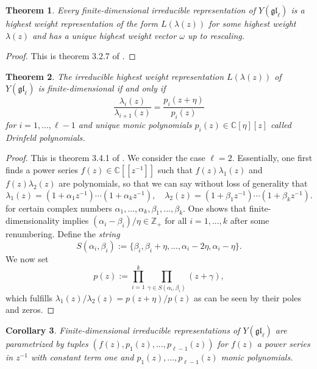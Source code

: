 \documentclass[11pt]{report}
\newtheorem{theorem}{Theorem}[section]
\newtheorem{corollary}[theorem]{Corollary}
\theoremstyle{definition}
\theoremstyle{remark}
\theoremstyle{remark}
\newcommand{\Z}{\mathbb{Z}}
\newcommand{\C}{\mathbb{C}}
\begin{document}
\begin{theorem}
Every finite-dimensional irreducible representation of $Y(\mathfrak{gl}_\ell)$ is a highest weight representation of the form $L(\lambda(z))$ for some highest weight $\lambda(z)$ and has a unique highest weight vector $\omega$ up to rescaling.
\end{theorem}

\begin{proof}
This is theorem 3.2.7 of \cite{book:molev}.
\end{proof}

\begin{theorem}
The irreducible highest weight representation $L(\lambda(z))$ of $Y(\mathfrak{gl}_\ell)$ is finite-dimensional if and only if
\begin{equation*}
\frac{\lambda_i(z)}{\lambda_{i+1}(z)} = \frac{p_i(z+\eta)}{p_i(z)}
\end{equation*}
for $i=1,...,\ell-1$ and unique monic polynomials $p_i(z) \in \C[\eta][z]$ called \emph{Drinfeld polynomials}.
\end{theorem}

\begin{proof}
This is theorem 3.4.1 of \cite{book:molev}. We consider the case $\ell = 2$. Essentially, one first finds a power series $f(z) \in \C[[z^{-1}]]$ such that $f(z) \lambda_1(z)$ and $f(z) \lambda_2(z)$ are polynomials, so that we can say without loss of generality that
\begin{equation*}
\lambda_1(z) = (1+\alpha_1 z^{-1}) \cdots (1+\alpha_k z^{-1}), \quad \lambda_2(z) = (1+\beta_1 z^{-1}) \cdots (1+\beta_k z^{-1}).
\end{equation*}
for certain complex numbers $\alpha_1,...,\alpha_k,\beta_1,...,\beta_k$. One shows that finite-dimensionality implies $(\alpha_i - \beta_i)/\eta \in \Z_+$ for all $i=1,...,k$ after some renumbering. Define the \emph{string}
\begin{equation*}
S(\alpha_i,\beta_i) := \{ \beta_i, \beta_i+\eta, ..., \alpha_i-2\eta, \alpha_i-\eta \}.
\end{equation*}
We now set
\begin{equation*}
p(z) := \prod_{i=1}^k \prod_{\gamma \in S(\alpha_i,\beta_i)} (z + \gamma),
\end{equation*}
which fulfills $\lambda_1(z) / \lambda_2(z) = p(z+\eta) / p(z)$ as can be seen by their poles and zeros.
\end{proof}

\begin{corollary}
Finite-dimensional irreducible representations of $Y(\mathfrak{gl}_\ell)$ are parametrized by tuples $(f(z),p_1(z),...,p_{\ell-1}(z))$ for $f(z)$ a power series in $z^{-1}$ with constant term one and $p_1(z),...,p_{\ell-1}(z)$ monic polynomials.
\end{corollary}
\end{document}
